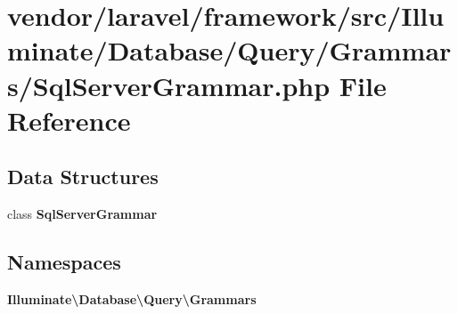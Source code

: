 \section{vendor/laravel/framework/src/\+Illuminate/\+Database/\+Query/\+Grammars/\+Sql\+Server\+Grammar.php File Reference}
\label{_query_2_grammars_2_sql_server_grammar_8php}
\subsection*{Data Structures}
\begin{DoxyCompactItemize}
\item 
class {\bf Sql\+Server\+Grammar}
\end{DoxyCompactItemize}
\subsection*{Namespaces}
\begin{DoxyCompactItemize}
\item 
 {\bf Illuminate\textbackslash{}\+Database\textbackslash{}\+Query\textbackslash{}\+Grammars}
\end{DoxyCompactItemize}
